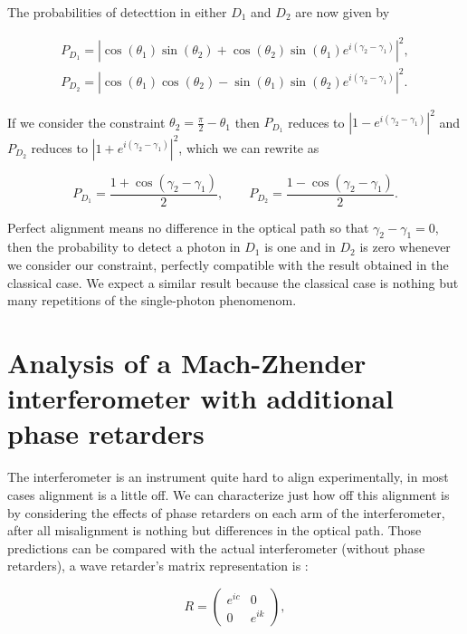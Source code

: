 \documentclass[12pt]{book}
\begin{document}
The probabilities of detecttion in either $D_{1}$ and $D_{2}$ are now given by

\begin{align}
P_{D_{1}}=|\cos(\theta_{1})\sin(\theta_{2})+\cos(\theta_{2})\sin(\theta_{1})e^{i(\gamma_{2}-\gamma_{1})}|^{2},\label{newergraph}\\
P_{D_{2}}=|\cos(\theta_{1})\cos(\theta_{2})-\sin(\theta_{1})\sin(\theta_{2})e^{i(\gamma_{2}-\gamma_{1})}|^{2}. \label{newgraph}
\end{align}

If we consider the constraint $\theta_{2}=\frac{\pi}{2}-\theta_{1}$ then $P_{D_{1}}$ reduces to $|1-e^{i(\gamma_{2}-\gamma_{1})}|^{2}$ and $P_{D_{2}}$ reduces to $|1+e^{i(\gamma_{2}-\gamma_{1})}|^{2}$, which we can rewrite as

\begin{equation}
P_{D_{1}}=\frac{1+\cos(\gamma_{2}-\gamma_{1})}{2}, \qquad P_{D_{2}}=\frac{1-\cos(\gamma_{2}-\gamma_{1})}{2}. \label{pp_wheler}
\end{equation}

Perfect alignment means no difference in the optical path so that $\gamma_{2}-\gamma_{1}=0$, then the probability to detect a photon in $D_{1}$ is one and in $D_{2}$ is zero whenever we consider our constraint, perfectly compatible with the result obtained in the classical case. We expect a similar result because the classical case is nothing but many repetitions of the single-photon phenomenom.

\section[Analysis with phase retarders]{Analysis of a Mach-Zhender interferometer with additional phase retarders}

The interferometer is an instrument quite hard to align experimentally, in most cases alignment is a little off. We can characterize just how off this alignment is by considering the effects of phase retarders on each arm of the interferometer, after all misalignment is nothing but differences in the optical path. Those predictions can be compared with the actual interferometer (without phase retarders), a wave retarder's  matrix representation is :


\begin{equation}
 R=\begin
{pmatrix} e^
{i c} & 0\\0& e^
{i k }\end
{pmatrix},
\end{equation}
\end{document}
